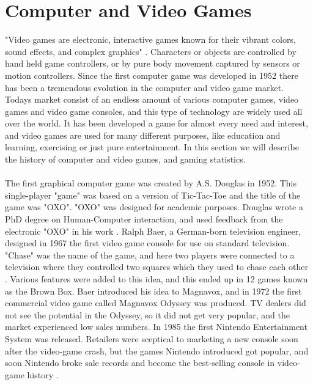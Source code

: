 \section{Computer and Video Games}
"Video games are electronic, interactive games known for their vibrant colors, sound effects, and complex graphics" \cite{videogamedef}. Characters or objects are controlled by hand held game controllers, or by pure body movement captured by sensors or motion controllers. Since the first computer game was developed in 1952 there has been a tremendous evolution in the computer and video game market. Todays market consist of an endless amount of various computer games, video games and video game consoles, and this type of technology are widely used all over the world. It has been developed a game for almost every need and interest, and video games are used for many different purposes, like education and learning, exercising or just pure entertainment. In this section we will describe the history of computer and video games, and gaming statistics. \\ \\
The first graphical computer game was created by A.S. Douglas in 1952. This single-player "game" was based on a version of Tic-Tac-Toe and the title of the game was "OXO". "OXO" was designed for academic purposes.  Douglas wrote a PhD degree on Human-Computer interaction, and used feedback from the electronic "OXO" in his work \cite{abouthiginbotham}. Ralph Baer, a German-born television engineer, designed in 1967 the first video game console for use on standard television. "Chase" was the name of the game, and here two players were connected to a television where they controlled two squares which they used to chase each other \cite{videogameHistory}. Various features were added to this idea, and this ended up in 12 games known as the Brown Box. Baer introduced his idea to Magnavox, and in 1972 the first commercial video game called Magnavox Odyssey was produced. TV dealers did not see the potential in the Odyssey, so it did not get very popular, and the market experienced low sales numbers. In 1985 the first Nintendo Entertainment System was released. Retailers were sceptical to marketing a new console soon after the video-game crash, but the games Nintendo introduced got popular, and soon Nintendo broke sale records and become the best-selling console in video-game history \cite{consoleHistory}. \\ \\
